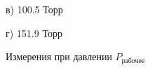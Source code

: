 \documentclass[a4paper, fontsize=12bp]{article}
\begin{document}
\begin{figure}[H]
\begin{minipage}[h]{0.47\linewidth}
\end{minipage}
\vfill
\begin{minipage}[h]{0.47\linewidth}
 в) 100.5 Торр \\
\end{minipage}
\hfill
\begin{minipage}[h]{0.47\linewidth}
 г) 151.9 Торр \\
\end{minipage}
\caption{Измерения при давлении $P_{\text{рабочее}}$}
\end{figure}
\end{document}
